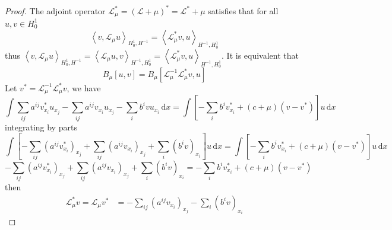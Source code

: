\begin{theorem}
    \begin{proof}
        The adjoint operator $\mathcal{L}_\mu^* = \left(\mathcal{L}+\mu\right)^*=\mathcal{L}^*+\mu$ satisfies that for all $u,v \in H^1_0$
        \begin{equation*}
            \left\langle v,\mathcal{L}_\mu u \right\rangle _{H_0^1,H^{-1}}
            =
            \left\langle \mathcal{L}_\mu^* v, u \right\rangle _{H^{-1},H_0^1}
        \end{equation*}
        thus $\left\langle v,\mathcal{L}_\mu u \right\rangle _{H_0^1,H^{-1}}=\left\langle \mathcal{L}_\mu u, v \right\rangle _{H^{-1},H_0^1}=\left\langle \mathcal{L}_\mu^* v, u \right\rangle _{H^{-1},H_0^1}$.
        It is equivalent that
        \begin{equation*}
            B_\mu\left[u,v\right]
            =
            B_\mu\left[\mathcal{L}_\mu^{-1}\mathcal{L}_\mu^* v, u\right]
        \end{equation*}
        Let $v^*=\mathcal{L}_\mu^{-1}\mathcal{L}_\mu^* v$, we have
        \begin{equation*}
            \int \sum_{ij} a^{ij}v^*_{x_i}u_{x_j}
            -\sum_{ij} a^{ij}v_{x_i}u_{x_j}
            -\sum_i b^i v u_{x_i} \, \mathrm{d}x
            =
            \int  \left[-\sum_i b^i v^*_{x_i} +\left(c+\mu\right)\left(v-v^*\right)\right]u
            \, \mathrm{d}x
        \end{equation*}
        integrating by parts
        \begin{equation*}
            \int \left[-\sum_{ij} \left(a^{ij}v^*_{x_i}\right)_{x_j}
                +\sum_{ij} \left(a^{ij}v_{x_i}\right)_{x_j}
                +\sum_i \left(b^i v\right)_{x_i}\right] u \, \mathrm{d}x
            =
            \int  \left[-\sum_i b^i v^*_{x_i} +\left(c+\mu\right)\left(v-v^*\right)\right]u
            \, \mathrm{d}x
        \end{equation*}
        \begin{equation*}
            -\sum_{ij} \left(a^{ij}v^*_{x_i}\right)_{x_j}
            +\sum_{ij} \left(a^{ij}v_{x_i}\right)_{x_j}
            +\sum_i \left(b^i v\right)_{x_i}
            =
            -\sum_i b^i v^*_{x_i} +\left(c+\mu\right)\left(v-v^*\right)
        \end{equation*}
        then
        \begin{equation*}
            \begin{aligned}
                \mathcal{L}_\mu^* v= \mathcal{L}_\mu v^*
                 & =
                -\sum_{ij} \left(a^{ij}v_{x_i}\right)_{x_j} -\sum_i \left(b^i v\right)_{x_i}

\end{aligned}
\end{equation*}
\end{proof}
\end{theorem}
